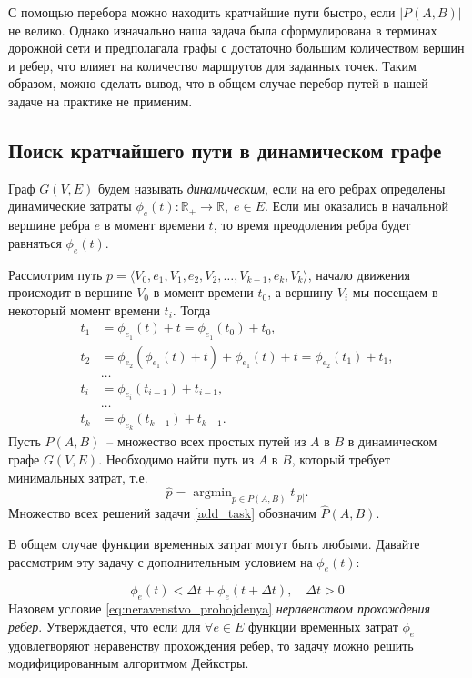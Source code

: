 \documentclass[12pt, a4paper]{article}
\DeclareMathOperator*{\argmin}{argmin}
\begin{document}
	С помощью перебора можно находить кратчайшие пути быстро, если $|P(A,B)|$ не велико. Однако изначально наша задача была сформулирована в терминах дорожной сети и предполагала графы с достаточно большим количеством вершин и ребер, что влияет на количество маршрутов для заданных точек. Таким образом, можно сделать вывод, что в общем случае перебор путей в нашей задаче на практике не применим.
	
	\newpage
	\subsection{Поиск кратчайшего пути в динамическом графе}
	
	Граф $G(V, E)$ будем называть  \textit{динамическим}, если на его ребрах определены динамические затраты $\phi_e(t) : \mathbb {R}_+ \rightarrow \mathbb {R}, \; e \in E$. Если мы оказались в начальной вершине ребра $e$ в момент времени $t$, то время преодоления ребра будет равняться $\phi_e(t)$.
	
	Рассмотрим путь $p = \langle V_0, e_1, V_1, e_2, V_2, \dots, V_{k-1}, e_k, V_k \rangle $, начало движения происходит в вершине $V_0$ в момент времени $t_0$, а вершину $V_i$ мы посещаем в некоторый момент времени $t_i$. Тогда 
	\begin{align*}
		t_1 & = \phi_{e_1}(t) + t = \phi_{e_1}(t_0) + t_0,  \\
		t_2 & = \phi_{e_2}(\phi_{e_1}(t) + t) + \phi_{e_1}(t) + t = \phi_{e_2}(t_1) + t_1, \\
		& \dots \\
		t_i & = \phi_{e_i}(t_{i-1}) + t_{i-1}, \\
		& \dots \\
		t_k & = \phi_{e_k}(t_{k-1}) + t_{k-1}.
	\end{align*}
	Пусть $P(A, B)$~-- множество всех простых путей из $A$ в $B$ в динамическом графе $G(V, E)$. Необходимо найти путь из $A$ в $B$, который требует минимальных затрат, т.е. 
	\begin{equation}
		\label{add_task}
		\widehat{p} = \argmin_{p \in P(A, B)} t_{|p|}.
	\end{equation}
	Множество всех решений задачи \eqref{add_task} обозначим $\widehat{P}(A, B)$.
	
	В общем случае функции временных затрат могут быть любыми. Давайте рассмотрим эту задачу с дополнительным условием на $\phi_e(t)$:
	
	\begin{equation}
		\label{eq:neravenstvo_prohojdenya}
		\phi_e(t) <\Delta t + \phi_e(t + \Delta t), \quad \Delta t > 0
	\end{equation}
	Назовем условие \eqref{eq:neravenstvo_prohojdenya} \textit{неравенством прохождения ребер}. Утверждается, что если для $\forall e \in E$ функции временных затрат $\phi_e$ удовлетворяют неравенству прохождения ребер, то задачу можно решить модифицированным алгоритмом Дейкстры.
	
\end{document}
